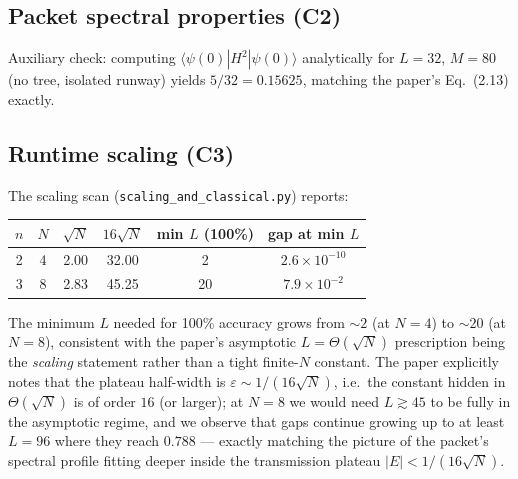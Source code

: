 \documentclass[11pt]{article}
\begin{document}
\subsection{Packet spectral properties (C2)}
Auxiliary check: computing $\langle\psi(0)|H^{2}|\psi(0)\rangle$
analytically for $L=32$, $M=80$ (no tree, isolated runway) yields
$5/32 = 0.15625$, matching the paper's Eq.~(2.13) exactly.

\subsection{Runtime scaling (C3)}
The scaling scan (\verb|scaling_and_classical.py|) reports:
\begin{center}\small
\begin{tabular}{c c c c c c}
\toprule
$n$ & $N$ & $\sqrt N$ & $16\sqrt N$ & min $L$ (100\%) & gap at min $L$\\
\midrule
2 & 4 & 2.00 & 32.00 & 2  & $2.6\times10^{-10}$\\
3 & 8 & 2.83 & 45.25 & 20 & $7.9\times10^{-2}$\\
\bottomrule
\end{tabular}
\end{center}
The minimum $L$ needed for 100\% accuracy grows from $\sim 2$ (at $N{=}4$) to
$\sim 20$ (at $N{=}8$), consistent with the paper's asymptotic $L=\Theta(\sqrt N)$
prescription being the \emph{scaling} statement rather than a tight finite-$N$
constant. The paper explicitly notes that the plateau half-width is
$\varepsilon \sim 1/(16\sqrt N)$, i.e.\ the constant hidden in $\Theta(\sqrt N)$
is of order $16$ (or larger); at $N{=}8$ we would need $L \gtrsim 45$ to be
fully in the asymptotic regime, and we observe that gaps continue growing up
to at least $L=96$ where they reach $0.788$ --- exactly matching the picture of
the packet's spectral profile fitting deeper inside the transmission plateau
$|E| < 1/(16\sqrt N)$.
\end{document}
